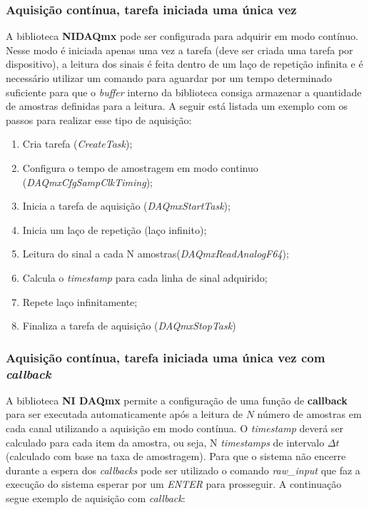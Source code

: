 \documentclass{ufscThesis}
\begin{document}

\subsubsection{Aquisição contínua, tarefa iniciada uma única vez}\label{aquisicao-continua}

A biblioteca \textbf{NIDAQmx} pode ser configurada para adquirir em modo contínuo. Nesse modo é iniciada apenas uma vez a tarefa (deve ser criada uma tarefa por dispositivo), a leitura dos sinais é feita dentro de um laço de repetição infinita e é necessário utilizar um comando para aguardar por um tempo determinado suficiente para que o \textit{buffer} interno da biblioteca consiga armazenar a quantidade de amostras definidas para a leitura. A seguir está listada um exemplo com os passos para realizar esse tipo de aquisição:
\begin{enumerate}
  \item Cria tarefa (\textit{CreateTask});
  \item Configura o tempo de amostragem em modo continuo (\textit{DAQmxCfgSampClkTiming});
  \item Inicia a tarefa de aquisição (\textit{DAQmxStartTask});
  \item Inicia um laço de repetição (laço infinito);
  \item Leitura do sinal a cada N amostras(\textit{DAQmxReadAnalogF64});
  \item Calcula o \textit{timestamp} para cada linha de sinal adquirido;
  \item Repete laço infinitamente;
  \item Finaliza a tarefa de aquisição (\textit{DAQmxStopTask})
\end{enumerate}

\subsubsection{Aquisição contínua, tarefa iniciada uma única vez com \textit{callback}}\label{aquisicao-continua-callback}

A biblioteca \textbf{NI DAQmx} permite a configuração de uma função de \textbf{callback} para ser executada automaticamente após a leitura de $N$ número de amostras em cada canal utilizando a aquisição em modo contínua. O \textit{timestamp} deverá ser calculado para cada item da amostra, ou seja, N \textit{timestamps} de intervalo $\Delta t$ (calculado com base na taxa de amostragem). Para que o sistema não encerre durante a espera dos \textit{callbacks} pode ser utilizado o comando \textit{raw\_input} que faz a execução do sistema esperar por um \textit{ENTER} para prosseguir. A continuação segue exemplo de aquisição com \textit{callback}:
\end{document}
